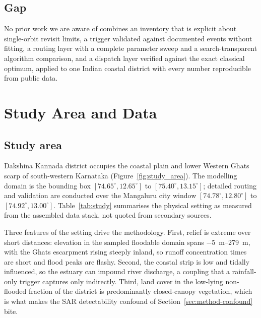 \documentclass[11pt,a4paper]{article}
\begin{document}
\subsection{Gap}
No prior work we are aware of combines an inventory that is explicit about
single-orbit revisit limits, a trigger validated against documented events
without fitting, a routing layer with a complete parameter sweep and a
search-transparent algorithm comparison, and a dispatch layer verified against
the exact classical optimum, applied to one Indian coastal district with every
number reproducible from public data.

\section{Study Area and Data}
\label{sec:study}

\subsection{Study area}
Dakshina Kannada district occupies the coastal plain and lower Western Ghats
scarp of south-western Karnataka (Figure~\ref{fig:study_area}). The modelling
domain is the bounding box $[74.65^\circ, 12.65^\circ]$ to
$[75.40^\circ, 13.15^\circ]$; detailed routing and validation are conducted over
the Mangaluru city window $[74.78^\circ, 12.80^\circ]$ to
$[74.92^\circ, 13.00^\circ]$. Table~\ref{tab:study} summarises the physical
setting as measured from the assembled data stack, not quoted from
secondary sources.

Three features of the setting drive the methodology. First, relief is extreme
over short distances: elevation in the sampled floodable domain spans
\SIrange{-5}{279}{\metre}, with the Ghats escarpment rising steeply inland, so
runoff concentration times are short and flood peaks are flashy. Second, the
coastal strip is low and tidally influenced, so the estuary can impound river
discharge, a coupling that a rainfall-only trigger captures only indirectly.
Third, land cover in the low-lying non-flooded fraction of the district is
predominantly closed-canopy vegetation, which is what makes the SAR detectability
confound of Section~\ref{sec:method-confound} bite.
\end{document}
